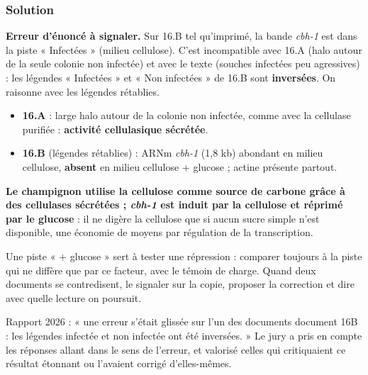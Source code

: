 \documentclass[11pt,a4paper]{article}
\providecommand{\tightlist}{\setlength{\itemsep}{0pt}\setlength{\parskip}{0pt}}
\begin{document}
\hypertarget{solution-29}{%
\subsubsection{Solution}\label{solution-29}}

\textbf{Erreur d'énoncé à signaler.} Sur 16.B tel qu'imprimé, la bande \emph{cbh-1} est dans la piste « Infectées » (milieu cellulose). C'est incompatible avec 16.A (halo autour de la seule colonie non infectée) et avec le texte (souches infectées peu agressives) : les légendes « Infectées » et « Non infectées » de 16.B sont \textbf{inversées}. On raisonne avec les légendes rétablies.

\begin{itemize}
\tightlist
\item
  \textbf{16.A} : large halo autour de la colonie non infectée, comme avec la cellulase purifiée : \textbf{activité cellulasique sécrétée}.
\item
  \textbf{16.B} (légendes rétablies) : ARNm \emph{cbh-1} (1,8 kb) abondant en milieu cellulose, \textbf{absent} en milieu cellulose + glucose ; actine présente partout.
\end{itemize}

\textbf{Le champignon utilise la cellulose comme source de carbone grâce à des cellulases sécrétées ; \emph{cbh-1} est induit par la cellulose et réprimé par le glucose} : il ne digère la cellulose que si aucun sucre simple n'est disponible, une économie de moyens par régulation de la transcription.

\begin{methode}

Une piste « + glucose » sert à tester une répression : comparer toujours à la piste qui ne diffère que par ce facteur, avec le témoin de charge. Quand deux documents se contredisent, le signaler sur la copie, proposer la correction et dire avec quelle lecture on poursuit.

\end{methode}

\begin{jury}

Rapport 2026 : « une erreur s'était glissée sur l'un des documents document 16B : les légendes infectée et non infectée ont été inversées. » Le jury a pris en compte les réponses allant dans le sens de l'erreur, et valorisé celles qui critiquaient ce résultat étonnant ou l'avaient corrigé d'elles-mêmes.

\end{jury}
\end{document}
